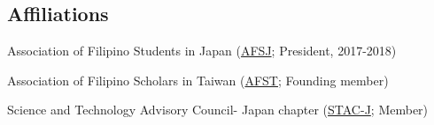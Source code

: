 \documentclass[11pt,letterpaper]{article}
\begin{document}
\subsection{Affiliations}
\begin{list}{}{\cvlist}
    \item Association of Filipino Students in Japan (\href{https://www.facebook.com/afsjpage/}{AFSJ}; President, 2017-2018)
    \item Association of Filipino Scholars in Taiwan  (\href{https://www.facebook.com/AssocIskolar/}{AFST}; Founding member)
    \item Science and Technology Advisory Council- Japan chapter (\href{https://www.facebook.com/profile.php?id=100083271798519}{STAC-J}; Member)
\end{list}
\end{document}
